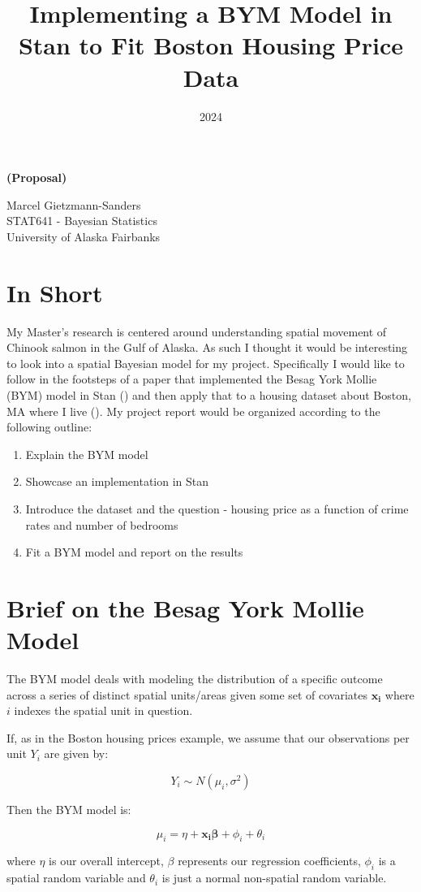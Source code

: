 \documentclass[11pt]{article}
\title{Implementing a BYM Model in Stan to Fit Boston Housing Price Data}
\date{2024}
\makeatletter
\renewcommand{\maketitle}{
\begin{center}

\pagestyle{empty}

{\Large \bf \@title\par}
\vspace{1cm}

{\Large \bf (Proposal) \par}
\vspace{1cm}

{\LARGE Marcel Gietzmann-Sanders}\\[1cm]

STAT641 - Bayesian Statistics \\
University of Alaska Fairbanks


\end{center}
}\makeatother
\makeatother
\begin{document}
\maketitle

\section{In Short}

My Master's research is centered around understanding spatial movement of 
Chinook salmon in the Gulf of Alaska. As such I thought it would be interesting
to look into a spatial Bayesian model for my project. Specifically I would like 
to follow in the footsteps of a paper that implemented the Besag York Mollie (BYM)
model in Stan (\cite{bymstan}) and then apply that to a housing dataset about 
Boston, MA where I live (\cite{book}). My project report would be organized according
to the following outline:

\begin{enumerate}
\item Explain the BYM model
\item Showcase an implementation in Stan
\item Introduce the dataset and the question - housing price as a function of crime rates and number of bedrooms
\item Fit a BYM model and report on the results
\end{enumerate}

\newpage

\section{Brief on the Besag York Mollie Model}

The BYM model deals with modeling the distribution of a specific outcome across a series 
of distinct spatial units/areas given some set of covariates $\bm{x_i}$ where $i$ indexes
the spatial unit in question. 

If, as in the Boston housing prices example, we assume that our observations per unit $Y_i$ are given by:

$$Y_i \sim N(\mu_i, \sigma^2)$$

Then the BYM model is:

$$\mu_i = \eta + \bm{x_i\beta} + \phi_i + \theta_i$$

where $\eta$ is our overall intercept, $\beta$ represents our regression coefficients, 
$\phi_i$ is a spatial random variable
and $\theta_i$ is just a normal non-spatial random variable.
\end{document}
